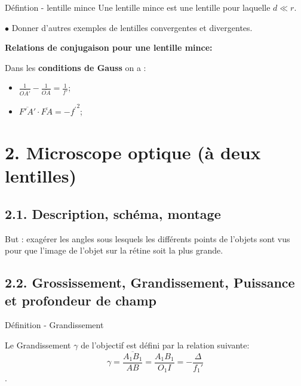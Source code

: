 \documentclass[french, a4paper, 10pt, twocolumn, landscape]{article}
\begin{document}
	\begin{definition}{Défintion - lentille mince}
		Une lentille mince est une lentille pour laquelle $d\ll r$.
	\end{definition}


$\bullet$ Donner d'autres exemples de lentilles convergentes et divergentes.


		\textbf{Relations de conjugaison pour une lentille mince:}\medskip

		Dans les \textbf{conditions de Gauss} on a : 
		\begin{itemize}
		\item $\frac{1}{\overline{OA'}}-\frac{1}{\overline{OA}} = \frac{1}{f'}$;
		\item $\overline{F'A'}\cdot \overline{FA} = -{f^\prime}^2 $;
		\end{itemize}


\section*{2. Microscope optique (à deux lentilles)}
\subsection*{2.1. Description, schéma, montage}


But : exagérer les angles sous lesquels les différents points de l'objets sont vus pour que l'image de l'objet sur la rétine soit la plus grande.


\subsection*{2.2. Grossissement, Grandissement, Puissance et profondeur de champ}

	\begin{definition}{Définition - Grandissement}

		Le Grandissement $\gamma$ de l'objectif est défini par la relation suivante:
		$$\gamma = \frac{\overline{A_1B_1}}{AB} = \frac{A_1B_1}{O_1I}=-\frac{\Delta}{f_1'}$$.
	\end{definition}
\end{document}
